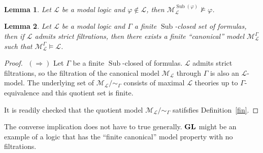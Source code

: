 \documentclass[a4paper]{article}
\theoremstyle{defin}
\theoremstyle{theorem}
\theoremstyle{prop}
\theoremstyle{lemma}
\newtheorem{lemma}{Lemma}
\theoremstyle{fact}
\theoremstyle{ex}
\theoremstyle{col}
\begin{document}
\begin{lemma}\label{good}
  Let $\mathcal{L}$ be a modal logic and $\varphi \not\in \mathcal{L}$, then $\mathcal{M}_{\mathcal{L}}^{\operatorname{Sub}(\varphi)} \nvDash \varphi$.
\end{lemma}

\begin{lemma} Let $\mathcal{L}$ be a modal logic and $\Gamma$ a finite $\operatorname{Sub}$-closed set of formulas, then if $\mathcal{L}$ admits strict filtrations, then there exists a finite ``canonical'' model $\mathcal{M}_{\mathcal{L}}^{\Gamma}$ such that $\mathcal{M}_{\mathcal{L}}^{\Gamma} \models \mathcal{L}$.
\end{lemma}

\begin{proof}
  $ $
$(\Rightarrow)$
  Let $\Gamma$ be a finite $\operatorname{Sub}$-closed of formulas. $\mathcal{L}$ admits strict filtrations, so the filtration of the canonical model $\mathcal{M}_{\mathcal{L}}$ through $\Gamma$ is also an $\mathcal{L}$-model. The underlying set of $\mathcal{M}_{\mathcal{L}} / \sim_{\Gamma}$ consists of maximal $\mathcal{L}$ theories up to $\Gamma$-equivalence and this quotient set is finite.

  It is readily checked that the quotient model $\mathcal{M}_{\mathcal{L}} / \sim_{\Gamma}$ satifsfies Definition~\ref{fin}.
\end{proof}

The converse implication does not have to true generally. ${\bf GL}$ might be an example of a logic that has the ``finite canonical'' model property with no filtrations.



\end{document}
